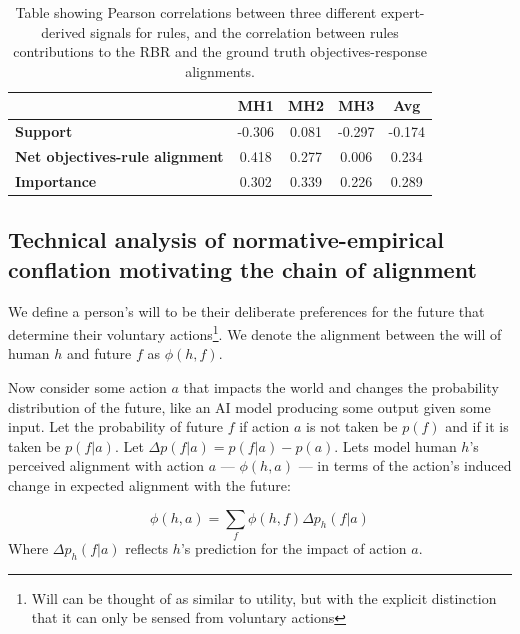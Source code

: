 \documentclass{article}
\begin{document}
\begin{table}[h]
\centering
\begin{tabular}{lccc|c}
\toprule
          & \textbf{MH1} & \textbf{MH2} & \textbf{MH3} & \textbf{Avg} \\ \midrule
\textbf{Support}       & -0.306       & 0.081        & -0.297       & -0.174       \\
\textbf{Net objectives-rule alignment} & 0.418        & 0.277        & 0.006        & 0.234        \\
\textbf{Importance}    & 0.302        & 0.339        & 0.226        & 0.289        \\ \bottomrule
\end{tabular}
\vspace{0.5em}
\caption{Table showing Pearson correlations between three different expert-derived signals for rules, and the correlation between rules contributions to the RBR and the ground truth objectives-response  alignments.}

\label{tab:expert signals}
\end{table}




\subsection{Technical analysis of normative-empirical conflation motivating the chain of alignment}
\label{a:coa_theory}


We define a person's will to be their deliberate preferences for the future that determine their voluntary actions\footnote{Will can be thought of as similar to utility, but with the explicit distinction that it can only be sensed from voluntary actions}. We denote the alignment between the will of human $h$ and future $f$ as $\phi(h,f)$.

Now consider some action $a$ that impacts the world and changes the probability distribution of the future, like an AI model producing some output given some input. Let the probability of future $f$ if action $a$ is not taken be $p(f)$ and if it is taken be $p(f|a)$. Let $\Delta p(f|a) = p(f|a)-p(a)$. Lets model human $h$'s perceived alignment with action $a$ --- $\phi(h,a)$ --- in terms of the action's induced change in expected alignment with the future:

\begin{equation}
    \phi(h,a) = \sum \limits_{f}\phi(h,f)\Delta p_h(f|a) 
\end{equation}
Where $\Delta p_h(f|a)$ reflects $h$'s prediction for the impact of action $a$. 
\end{document}
